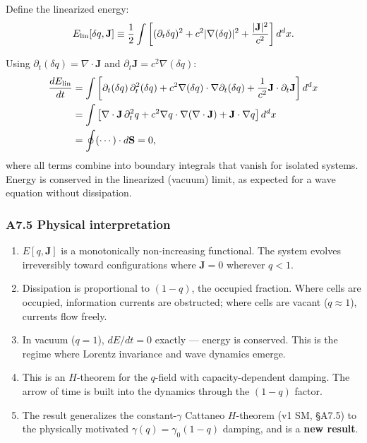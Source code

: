 \documentclass[reprint]{revtex4-2}
\begin{document}
Define the linearized energy:
\begin{equation}
E_{\rm lin}[\delta q, \mathbf{J}] \equiv \frac{1}{2}\int \left[(\partial_t\delta q)^2 + c^2|\nabla(\delta q)|^2 + \frac{|\mathbf{J}|^2}{c^2}\right] d^d x.
\end{equation}

Using $\partial_t(\delta q) = \nabla\cdot\mathbf{J}$ and $\partial_t\mathbf{J} = c^2\nabla(\delta q)$:
\begin{align}
\frac{dE_{\rm lin}}{dt} &= \int \left[\partial_t(\delta q)\,\partial_t^2(\delta q) + c^2\nabla(\delta q)\cdot\nabla\partial_t(\delta q) + \frac{1}{c^2}\mathbf{J}\cdot\partial_t\mathbf{J}\right] d^d x \nonumber \\
&= \int \left[\nabla\cdot\mathbf{J}\,\partial_t^2 q + c^2\nabla q\cdot\nabla(\nabla\cdot\mathbf{J}) + \mathbf{J}\cdot\nabla q\right] d^d x \nonumber \\
&= \oint (\cdots)\cdot d\mathbf{S} = 0,
\end{align}
where all terms combine into boundary integrals that vanish for isolated systems. Energy is conserved in the linearized (vacuum) limit, as expected for a wave equation without dissipation.

\subsubsection{A7.5 Physical interpretation}

\begin{enumerate}[label=(\roman*)]
\item $E[q,\mathbf{J}]$ is a monotonically non-increasing functional. The system evolves irreversibly toward configurations where $\mathbf{J}=0$ wherever $q<1$.
\item Dissipation is proportional to $(1-q)$, the occupied fraction. Where cells are occupied, information currents are obstructed; where cells are vacant ($q\approx 1$), currents flow freely.
\item In vacuum ($q=1$), $dE/dt = 0$ exactly --- energy is conserved. This is the regime where Lorentz invariance and wave dynamics emerge.
\item This is an $H$-theorem for the $q$-field with capacity-dependent damping. The arrow of time is built into the dynamics through the $(1-q)$ factor.
\item The result generalizes the constant-$\gamma$ Cattaneo $H$-theorem (v1 SM, \S A7.5) to the physically motivated $\gamma(q)=\gamma_0(1-q)$ damping, and is a \textbf{new result}.
\end{enumerate}
\end{document}
